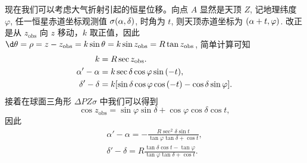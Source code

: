 \documentclass[UTF8, 12pt, a4paper, oneside, onecolumn, fontset=none]{ctexart}
\begin{document}
现在我们可以考虑大气折射引起的恒星位移。向点 $A$ 显然是天顶 $Z$, 记地理纬度 $\varphi$, 任一恒星赤道坐标观测值 $\sigma\mleft(\alpha,\delta\mright)$, 时角为 $t$, 则天顶赤道坐标为 $\mleft(\alpha+t,\varphi\mright)$. 改正是从 $z_{\mathrm{obs}}$ 向 $z$ 移动，$k$ 取正值，因此 $\d\theta=\rho=z-z_{\mathrm{obs}}=k\sin{\theta}=k\sin{z_{\mathrm{obs}}}=R\tan{z_{\mathrm{obs}}}$, 简单计算可知
\begin{align}
k&=R\sec{z_{\mathrm{obs}}}.\\
\alpha'-\alpha&=k\sec{\delta}\cos{\varphi}\sin{\mleft(-t\mright)},\\
\delta'-\delta&=k\mleft[\sin{\delta}\cos{\varphi}\cos{\mleft(-t\mright)}-\cos{\delta}\sin{\varphi}\mright].
\end{align}
接着在球面三角形 $\Delta{}PZ\sigma$ 中我们可以得到
\begin{equation}
\cos{z_{\mathrm{obs}}}=\sin{\varphi}\sin{\delta}+\cos{\varphi}\cos{\delta}\cos{t},
\end{equation}
因此
\begin{align}
\alpha'-\alpha=-\frac{R\sec^{2}{\delta}\sin{t}}{\tan{\varphi}\tan{\delta}+\cos{t}},\\
\delta'-\delta=R\frac{\tan{\delta}\cos{t}-\tan{\varphi}}{\tan{\varphi}\tan{\delta}+\cos{t}}.
\end{align}
\end{document}
